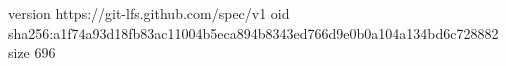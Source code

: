 version https://git-lfs.github.com/spec/v1
oid sha256:a1f74a93d18fb83ac11004b5eca894b8343ed766d9e0b0a104a134bd6c728882
size 696
